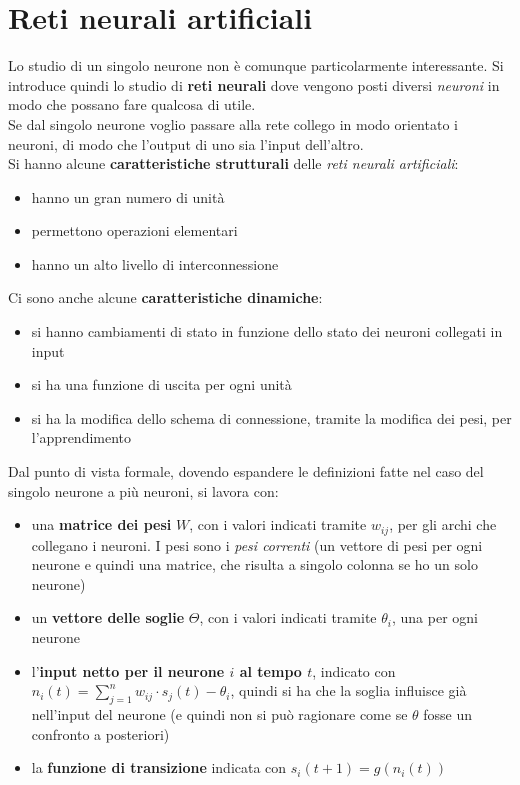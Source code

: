 \documentclass[a4paper,12pt, oneside]{book}
\begin{document}
\section{Reti neurali artificiali}
Lo studio di un singolo neurone non è comunque particolarmente interessante. Si
introduce quindi lo studio di \textbf{reti neurali} dove vengono posti diversi
\textit{neuroni} in modo che possano fare qualcosa di utile.\\
Se dal singolo neurone voglio passare alla rete collego in modo orientato i
neuroni, di modo che l'output di uno sia l'input dell'altro. \\
Si hanno alcune \textbf{caratteristiche strutturali} delle \textit{reti neurali
  artificiali}:
\begin{itemize}
  \item hanno un gran numero di unità
  \item permettono operazioni elementari
  \item hanno un alto livello di interconnessione
\end{itemize}
Ci sono anche alcune \textbf{caratteristiche dinamiche}:
\begin{itemize}
  \item si hanno cambiamenti di stato in funzione dello stato dei neuroni
  collegati in input
  \item si ha una funzione di uscita per ogni unità
  \item si ha la modifica dello schema di connessione, tramite la modifica dei
  pesi, per l'apprendimento
\end{itemize}
Dal punto di vista formale, dovendo espandere le definizioni fatte nel caso del
singolo neurone a più neuroni, si lavora con:
\begin{itemize}
  \item una \textbf{matrice dei pesi} $W$, con i valori indicati tramite
  $w_{ij}$, per gli archi che collegano i neuroni. I pesi sono i \textit{pesi
    correnti} (un vettore di pesi per ogni neurone e quindi una matrice, che
  risulta a singolo colonna se ho un solo neurone)
  \item un \textbf{vettore delle soglie} $\Theta$, con i valori indicati tramite
  $\theta_i$, una per ogni neurone
  \item l'\textbf{input netto per il neurone $i$ al tempo $t$}, indicato con\\
  $n_i(t)=\sum_{j=1}^n w_{ij}\cdot s_j(t)-\theta_i$, quindi si ha che la soglia
  influisce già nell'input del neurone (e quindi non si può ragionare come se
  $\theta$ fosse un confronto a posteriori)
  \item la \textbf{funzione di transizione} indicata con $s_i(t+1)=g(n_i(t))$
\end{itemize}
\end{document}
